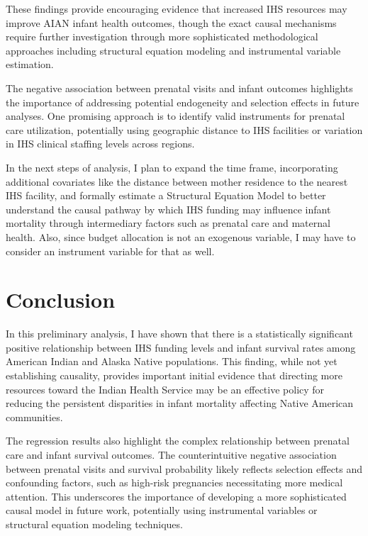 \documentclass[12pt]{article}
\begin{document}
These findings provide encouraging evidence that increased IHS resources may improve AIAN infant health outcomes, though the exact causal mechanisms require further investigation through more sophisticated methodological approaches including structural equation modeling and instrumental variable estimation.

The negative association between prenatal visits and infant outcomes highlights the importance of addressing potential endogeneity and selection effects in future analyses. One promising approach is to identify valid instruments for prenatal care utilization, potentially using geographic distance to IHS facilities or variation in IHS clinical staffing levels across regions.

In the next steps of analysis, I plan to expand the time frame, incorporating additional covariates like the distance between mother residence to the nearest IHS facility, and formally estimate a Structural Equation Model to better understand the causal pathway by which IHS funding may influence infant mortality through intermediary factors such as prenatal care and maternal health. Also, since budget allocation is not an exogenous variable, I may have to consider an instrument variable for that as well. 

\section{Conclusion}

In this preliminary analysis, I have shown that there is a statistically significant positive relationship between IHS funding levels and infant survival rates among American Indian and Alaska Native populations. This finding, while not yet establishing causality, provides important initial evidence that directing more resources toward the Indian Health Service may be an effective policy for reducing the persistent disparities in infant mortality affecting Native American communities.

The regression results also highlight the complex relationship between prenatal care and infant survival outcomes. The counterintuitive negative association between prenatal visits and survival probability likely reflects selection effects and confounding factors, such as high-risk pregnancies necessitating more medical attention. This underscores the importance of developing a more sophisticated causal model in future work, potentially using instrumental variables or structural equation modeling techniques.
\end{document}
